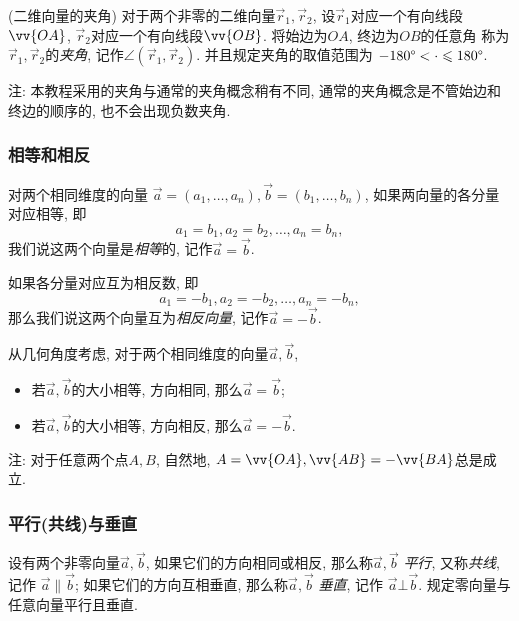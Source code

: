 \begin{definition}(二维向量的夹角)
  对于两个非零的二维向量$\vec r_1, \vec r_2$,
  设$\vec r_1$对应一个有向线段$\vv{OA}$,
  $\vec r_2$对应一个有向线段$\vv{OB}$.
  将始边为$OA$, 终边为$OB$的任意角
  称为$\vec r_1,\vec r_2$的\emph{夹角},
  记作$\angle(\vec r_1,\vec r_2)$.
  并且规定夹角的取值范围为
  $-180\degree < \cdot \leqslant 180\degree$.

  注: 本教程采用的夹角与通常的夹角概念稍有不同,
  通常的夹角概念是不管始边和终边的顺序的, 也不会出现负数夹角.
\end{definition}

\subsubsection{相等和相反}

对两个相同维度的向量
$\vec{a}=(a_1,\dots,a_n),\vec{b}=(b_1,\dots,b_n)$,
如果两向量的各分量对应相等, 即
\[a_1=b_1,a_2=b_2,\dots,a_n=b_n,\]
我们说这两个向量是\emph{相等}的,
记作$\vec{a}=\vec{b}$.

如果各分量对应互为相反数, 即
\[a_1=-b_1,a_2=-b_2,\dots,a_n=-b_n,\]
那么我们说这两个向量互为\emph{相反向量},
记作$\vec{a}=-\vec{b}$.

从几何角度考虑, 对于两个相同维度的向量$\vec{a},\vec{b}$,
\begin{itemize}
  \item 若$\vec{a},\vec{b}$的大小相等, 方向相同, 那么$\vec{a}=\vec{b}$;
  \item 若$\vec{a},\vec{b}$的大小相等, 方向相反, 那么$\vec{a}=-\vec{b}$.
\end{itemize}

注: 对于任意两个点$A,B$, 自然地,
$A=\vv{OA}, \vv{AB}=-\vv{BA}$总是成立.

\subsubsection{平行(共线)与垂直}

设有两个非零向量$\vec{a},\vec{b}$,
如果它们的方向相同或相反, 那么称$\vec{a},\vec{b}$
\emph{平行}, 又称\emph{共线}, 记作
$\vec{a}\parallel\vec{b}$;
如果它们的方向互相垂直, 那么称$\vec{a},\vec{b}$
\emph{垂直}, 记作
$\vec{a}\bot\vec{b}$.
规定零向量与任意向量平行且垂直.


